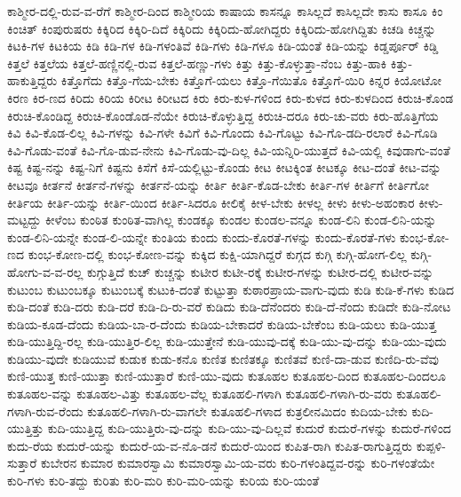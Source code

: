 {ಕಾಶ್ಮೀರ-ದಲ್ಲಿ-ರುವ-ವ-ರೆಗೆ
ಕಾಶ್ಮೀರ-ದಿಂದ
ಕಾಶ್ಮೀರಿಯ
ಕಾಷಾಯ
ಕಾಸನ್ನೂ
ಕಾಸಿಲ್ಲದೆ
ಕಾಸಿಲ್ಲದೇ
ಕಾಸು
ಕಾಸೂ
ಕಿಂ
ಕಿಂಚಿತ್
ಕಿಂಪುರುಷರು
ಕಿಕ್ಕಿರಿದ
ಕಿಕ್ಕಿರಿ-ದಿದೆ
ಕಿಕ್ಕಿರಿದು
ಕಿಕ್ಕಿರಿದು-ಹೋಗಿದ್ದರು
ಕಿಕ್ಕಿರಿದು-ಹೋಗಿದ್ದಿತು
ಕಿಚಡಿ
ಕಿಚ್ಚನ್ನು
ಕಿಟಕಿ-ಗಳ
ಕಿಟಕಿಯ
ಕಿಡಿ
ಕಿಡಿ-ಗಳ
ಕಿಡಿ-ಗಳಂತಿವೆ
ಕಿಡಿ-ಗಳು
ಕಿಡಿ-ಗಳೂ
ಕಿಡಿ-ಯಂತೆ
ಕಿಡಿ-ಯನ್ನು
ಕಿಡ್ಡರ್ಪೂರ್
ಕಿಡ್ಡಿ
ಕಿತ್ತಲೆ
ಕಿತ್ತಲೆಯ
ಕಿತ್ತಲೆ-ಹಣ್ಣಿನಲ್ಲಿ-ರುವ
ಕಿತ್ತಲೆ-ಹಣ್ಣು-ಗಳು
ಕಿತ್ತು
ಕಿತ್ತು-ಕೊಳ್ಳುತ್ತಾ-ನೆಂಬ
ಕಿತ್ತು-ಹಾಕಿ
ಕಿತ್ತು-ಹಾಕುತ್ತಿದ್ದರು
ಕಿತ್ತೊಗೆದು
ಕಿತ್ತೊ-ಗೆಯ-ಬೇಕು
ಕಿತ್ತೊಗೆ-ಯಲು
ಕಿತ್ತೊ-ಗೆಯಿತೊ
ಕಿತ್ತೊಗೆ-ಯಿರಿ
ಕಿನ್ನರ
ಕಿಯೋಟೋ
ಕಿರಣ
ಕಿರ-ಣದ
ಕಿರಿದು
ಕಿರಿಯ
ಕಿರೀಟ
ಕಿರೀಟದ
ಕಿರು
ಕಿರು-ಕುಳ-ಗಳಿಂದ
ಕಿರು-ಕುಳದ
ಕಿರು-ಕುಳದಿಂದ
ಕಿರುಚಿ-ಕೊಂಡ
ಕಿರುಚಿ-ಕೊಂಡಿದ್ದ
ಕಿರುಚಿ-ಕೊಂಡೊಡ-ನೆಯೇ
ಕಿರುಚಿ-ಕೊಳ್ಳುತ್ತಿದ್ದ
ಕಿರುಚಿ-ದರೂ
ಕಿರು-ಚು-ವರು
ಕಿರು-ಹೊತ್ತಿಗೆಯ
ಕಿವಿ
ಕಿವಿ-ಕೊಡ-ಲಿಲ್ಲ
ಕಿವಿ-ಗಳನ್ನು
ಕಿವಿ-ಗಳೇ
ಕಿವಿಗೆ
ಕಿವಿ-ಗೊಂದು
ಕಿವಿ-ಗೊಟ್ಟು
ಕಿವಿ-ಗೊ-ಡದಿ-ರಲಾರೆ
ಕಿವಿ-ಗೊಡಿ
ಕಿವಿ-ಗೊಡು-ವಂತೆ
ಕಿವಿ-ಗೊ-ಡುವ-ನೇನು
ಕಿವಿ-ಗೊಡು-ವು-ದಿಲ್ಲ
ಕಿವಿ-ಯನ್ನಿರಿ-ಯುತ್ತದೆ
ಕಿವಿ-ಯಲ್ಲಿ
ಕಿವುಡಾಗು-ವಂತೆ
ಕಿಷ್ಟ
ಕಿಷ್ಟ-ನನ್ನು
ಕಿಷ್ಟ-ನಿಗೆ
ಕಿಷ್ಟನು
ಕಿಸೆಗೆ
ಕಿಸೆ-ಯಲ್ಲಿಟ್ಟು-ಕೊಂಡು
ಕೀಟ
ಕೀಟಕ್ಕಿಂತ
ಕೀಟಕ್ಕೂ
ಕೀಟ-ದಂತೆ
ಕೀಟ-ವನ್ನು
ಕೀಟವೂ
ಕೀರ್ತನೆ
ಕೀರ್ತನೆ-ಗಳನ್ನು
ಕೀರ್ತನೆ-ಯನ್ನು
ಕೀರ್ತಿ
ಕೀರ್ತಿ-ಕೊಡ-ಬೇಕು
ಕೀರ್ತಿ-ಗಳ
ಕೀರ್ತಿಗೆ
ಕೀರ್ತಿಗೋ
ಕೀರ್ತಿಯ
ಕೀರ್ತಿ-ಯನ್ನು
ಕೀರ್ತಿ-ಯಿಂದ
ಕೀರ್ತಿ-ಸಿದರೂ
ಕೀಲಿಕೈ
ಕೀಳ-ಬೇಕು
ಕೀಳಲ್ಲ
ಕೀಳು
ಕೀಳು-ಅಹಂಕಾರ
ಕೀಳು-ಮಟ್ಟದ್ದು
ಕೀಳೆಂಬ
ಕುಂಠಿತ
ಕುಂಠಿತ-ವಾಗಿಲ್ಲ
ಕುಂಡಕ್ಕೂ
ಕುಂಡಲ
ಕುಂಡಲ-ವನ್ನೂ
ಕುಂಡ-ಲಿನಿ
ಕುಂಡ-ಲಿನಿ-ಯನ್ನು
ಕುಂಡ-ಲಿನಿ-ಯನ್ನೇ
ಕುಂಡ-ಲಿ-ಯನ್ನೇ
ಕುಂತಿಯ
ಕುಂದು
ಕುಂದು-ಕೊರತೆ-ಗಳನ್ನು
ಕುಂದು-ಕೊರತೆ-ಗಳು
ಕುಂಭ-ಕೋ-ಣದ
ಕುಂಭ-ಕೋಣ-ದಲ್ಲಿ
ಕುಂಭ-ಕೋಣ-ವನ್ನು
ಕುಕ್ಕಿದ
ಕುಕ್ಷಿ-ಯಾಗಿದ್ದರೆ
ಕುಗ್ಗದ
ಕುಗ್ಗಿ
ಕುಗ್ಗಿ-ಹೋಗ-ಲಿಲ್ಲ
ಕುಗ್ಗಿ-ಹೋಗು-ವ-ವ-ರಲ್ಲ
ಕುಗ್ಗುತ್ತಿದೆ
ಕುಚ್
ಕುಚ್ಚನ್ನು
ಕುಟೀರ
ಕುಟೀ-ರಕ್ಕೆ
ಕುಟೀರ-ಗಳನ್ನು
ಕುಟೀರ-ದಲ್ಲಿ
ಕುಟೀರ-ವನ್ನು
ಕುಟುಂಬ
ಕುಟುಂಬಕ್ಕೂ
ಕುಟುಂಬಕ್ಕೆ
ಕುಟುಕಿ-ದಂತೆ
ಕುಟ್ಟುತ್ತಾ
ಕುಠಾರಪ್ರಾಯ-ವಾಗು-ವುದು
ಕುಡಿ
ಕುಡಿ-ಕೆ-ಗಳು
ಕುಡಿದ
ಕುಡಿ-ದಂತೆ
ಕುಡಿ-ದರು
ಕುಡಿ-ದರೆ
ಕುಡಿ-ದಿ-ರು-ವರೆ
ಕುಡಿದು
ಕುಡಿ-ದೆನೆಂದರು
ಕುಡಿ-ದೆ-ನೆಂದು
ಕುಡಿದೇ
ಕುಡಿ-ನೋಟ
ಕುಡಿಯ-ಕೂಡ-ದೆಂದು
ಕುಡಿಯ-ಬಾ-ರ-ದೆಂದು
ಕುಡಿಯ-ಬೇಕಾದರೆ
ಕುಡಿಯ-ಬೇಕೆಂಬ
ಕುಡಿ-ಯಲು
ಕುಡಿ-ಯುತ್ತ
ಕುಡಿ-ಯುತ್ತಿದ್ದಿ-ರಲ್ಲ
ಕುಡಿ-ಯುತ್ತಿರ-ಲಿಲ್ಲ
ಕುಡಿ-ಯುತ್ತೇನೆ
ಕುಡಿ-ಯುವು-ದಕ್ಕೆ
ಕುಡಿ-ಯು-ವು-ದನ್ನು
ಕುಡಿ-ಯು-ವುದು
ಕುಡಿಯು-ವುದೇ
ಕುಡಿಯುವೆ
ಕುಡುಕ
ಕುಡು-ಕನೊ
ಕುಣಿತ
ಕುಣಿತಕ್ಕೂ
ಕುಣಿತವೆ
ಕುಣಿ-ದಾ-ಡುವ
ಕುಣಿದಿ-ರು-ವೆವು
ಕುಣಿ-ಯುತ್ತ
ಕುಣಿ-ಯುತ್ತಾ
ಕುಣಿ-ಯುತ್ತಾರೆ
ಕುಣಿ-ಯು-ವುದು
ಕುತೂಹಲ
ಕುತೂಹಲ-ದಿಂದ
ಕುತೂಹಲ-ದಿಂದಲೂ
ಕುತೂಹಲ-ವನ್ನು
ಕುತೂಹಲ-ವಿತ್ತು
ಕುತೂಹಲ-ವೆಲ್ಲ
ಕುತೂಹಲಿ-ಗಳಾಗಿ
ಕುತೂಹಲಿ-ಗಳಾಗಿ-ರು-ವರು
ಕುತೂಹಲಿ-ಗಳಾಗಿ-ರುವ-ರೆಂದು
ಕುತೂಹಲಿ-ಗಳಾಗಿ-ರು-ವಾಗಲೇ
ಕುತೂಹಲಿ-ಗಳಾದ
ಕುತ್ರಲೀನಮಿದಂ
ಕುದಿಯ-ಬೇಕು
ಕುದಿ-ಯುತ್ತಿತ್ತು
ಕುದಿ-ಯುತ್ತಿದ್ದ
ಕುದಿ-ಯುತ್ತಿರು-ವು-ದನ್ನು
ಕುದಿ-ಯು-ವು-ದಿಲ್ಲವೆ
ಕುದುರೆ
ಕುದುರೆ-ಗಳನ್ನು
ಕುದುರೆ-ಗಳಿಂದ
ಕುದು-ರೆಯ
ಕುದುರೆ-ಯನ್ನು
ಕುದುರೆ-ಯ-ವ-ನೊ-ಡನೆ
ಕುದುರೆ-ಯಿಂದ
ಕುಪಿತ-ರಾಗಿ
ಕುಪಿತ-ರಾಗುತ್ತಿದ್ದರು
ಕುಪ್ಪಳಿ-ಸುತ್ತಾರೆ
ಕುಬೇರನ
ಕುಮಾರ
ಕುಮಾರಸ್ವಾಮಿ
ಕುಮಾರಸ್ವಾಮಿ-ಯ-ವರು
ಕುರಿ-ಗಳಂತಿದ್ದವ-ರನ್ನು
ಕುರಿ-ಗಳಂತೆಯೇ
ಕುರಿ-ಗಳು
ಕುರಿ-ತದ್ದು
ಕುರಿತು
ಕುರಿ-ಮರಿ
ಕುರಿ-ಮರಿ-ಯನ್ನು
ಕುರಿಯ
ಕುರಿ-ಯಂತೆ
}
